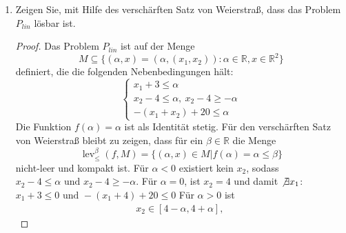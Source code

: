 \documentclass[12pt]{extreport} %
\newcommand{\R}{\mathbb{R}}
\theoremstyle{named}
\theoremstyle{nnamed}
\theoremstyle{itshape}
\theoremstyle{normal}
\begin{document}
\begin{enumerate}
\begin{proof}
			Die Bedingung $f(x) \leq \alpha$ aus der Epigraph-Formulierung bedeutet, dass jede Komponente des Maximums kleiner gleich $\alpha$ sein muss, d.h. das folgende Problem ist äquivalent zu $P_{epi}$:
			$$  \tilde{P}_{epi}: \min_{(x, \alpha) \in \R^2 \times \R} e^{\alpha} \text{ s.t. } x \in X, \begin{cases} x_1 + 3 \leq \alpha \\
			 x_2 - 4 \leq \alpha, ~ x_2 - 4 \geq - \alpha \\ -(x_1 + x_2) + 20 \leq \alpha \end{cases} $$
			 Da die Exponentialfunktion streng monoton ist, ist jedes Minimum der Identität auf dieser Menge gleich dem Minimum der Exponentialfunktion. Ein lineares Optimierungsproblem $P_{lin}$, welches die selben Optimalpunkte wie $P_{epi}$ besitzt, lautet somit
			$$  {P}_{lin}: \min_{(x, \alpha) \in \R^2 \times \R} \alpha \text{ s.t. } x \in X, \begin{cases} x_1 + 3 \leq \alpha \\
			 x_2 - 4 \leq \alpha, ~ x_2 - 4 \geq - \alpha \\ -(x_1 + x_2) + 20 \leq \alpha \end{cases} $$			 
		\end{proof}
	\item Zeigen Sie, mit Hilfe des verschärften Satz von Weierstraß, dass das Problem $P_{lin}$ lösbar ist.
		\begin{proof}
			Das Problem $P_{lin}$ ist auf der Menge $$M \subseteq \big\{ (\alpha, x) = (\alpha, (x_1, x_2)) : \alpha \in \R, x \in \R^2 \big\}$$ definiert, die die folgenden Nebenbedingungen hält:
			$$\begin{cases} x_1 + 3 \leq \alpha \\
			 x_2 - 4 \leq \alpha, ~ x_2 - 4 \geq - \alpha \\ -(x_1 + x_2) + 20 \leq \alpha \end{cases} $$	
			 Die Funktion $f(\alpha) = \alpha$ ist als Identität stetig. Für den verschärften Satz von Weierstraß bleibt zu zeigen, dass für ein $\beta \in \R$ die Menge
			  $$ \operatorname{lev}_{\leq}^{\beta}(f, M)= \big\{ (\alpha, x) \in M | f(\alpha) = \alpha \leq \beta \big\}  $$
			  nicht-leer und kompakt ist. Für $\alpha < 0$ existiert kein $x_2$, sodass $x_2 - 4 \leq \alpha \text{ und } x_2 -4 \geq - \alpha$. Für $\alpha = 0$, ist $x_2 = 4$ und damit $\not\exists x_1$: $x_1 + 3 \leq 0 \text{ und } - (x_1 + 4) + 20 \leq 0$ Für $\alpha > 0$ ist 
			 \begin{align}
				 x_2 \in [4 - \alpha, 4 + \alpha], ~  \tag*{$(*)$}

\end{align}
\end{proof}
\end{enumerate}
\end{document}
